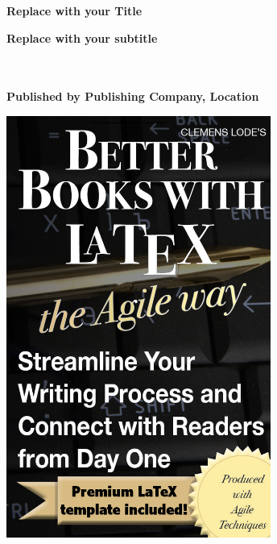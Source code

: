 \vspace{3cm}
  \begin{center}
	\bfseries \sffamily \Huge Replace with your Title\par
	\bfseries \LARGE Replace with your subtitle\par
~\\
	~\\
	\bfseries \small Published by Publishing Company, Location\par
	
    \ifxetex
		\includegraphics[width=0.65\textwidth]{images/cover_highres.png}
	\else

\end{center}
